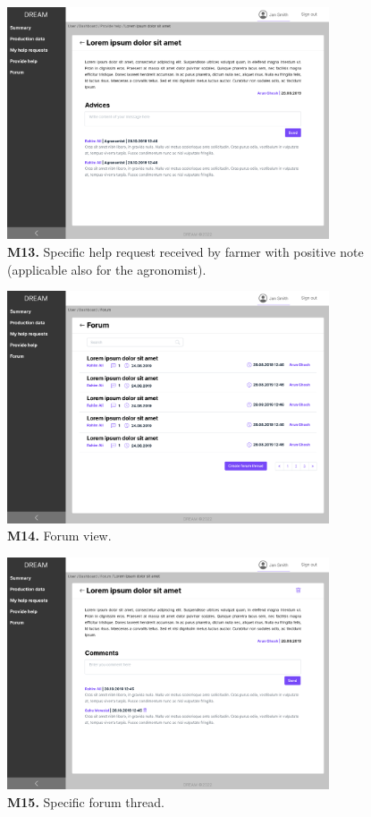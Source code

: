 \begin{figure}[H]
    \centering
    \includegraphics[width=0.85\textwidth]{mockups/Farmer_Dashboard_Provide help_Request.png}
    \caption{\textbf{M13.} Specific help request received by farmer with positive note (applicable also for the agronomist).}
\end{figure}

\begin{figure}[H]
    \centering
    \includegraphics[width=0.85\textwidth]{mockups/Farmer_Dashboard_Forum.png}
    \caption{\textbf{M14.} Forum view.}
\end{figure}

\begin{figure}[H]
    \centering
    \includegraphics[width=0.85\textwidth]{mockups/Farmer_Dashboard_Forum_Thread.png}
    \caption{\textbf{M15.} Specific forum thread.}
\end{figure}

